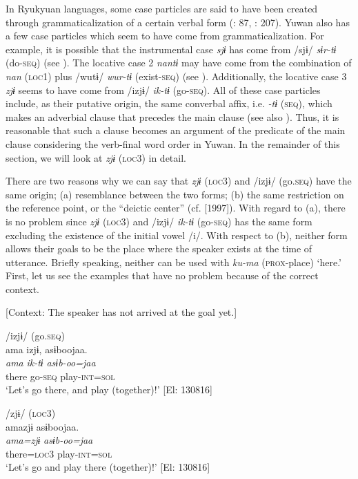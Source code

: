 In Ryukyuan languages, some case particles are said to have been created through grammaticalization of a certain verbal form (\citealt{NishiokaNakahara2000}: 87, \citealt{Shimoji2008}: 207). Yuwan also has a few case particles which seem to have come from grammaticalization. For example, it is possible that the instrumental case \textit{sjɨ} has come from /sjɨ/ \textit{sɨr-tɨ} (do-\textsc{seq}) (see ). The locative case 2 \textit{nantɨ} may have come from the combination of \textit{nan} (\textsc{loc1}) plus /wutɨ/ \textit{wur-tɨ} (exist-\textsc{seq}) (see ). Additionally, the locative case 3 \textit{zjɨ} seems to have come from /izjɨ/ \textit{ik-tɨ} (go-\textsc{seq}). All of these case particles include, as their putative origin, the same converbal affix, i.e. \textit{-tɨ} (\textsc{seq}), which makes an adverbial clause that precedes the main clause (see also ). Thus, it is reasonable that such a clause becomes an argument of the predicate of the main clause considering the verb-final word order in Yuwan. In the remainder of this section, we will look at \textit{zjɨ} (\textsc{loc3}) in detail.

There are two reasons why we can say that \textit{zjɨ} (\textsc{loc3}) and /izjɨ/ (go.\textsc{seq}) have the same origin; (a) resemblance between the two forms; (b) the same restriction on the reference point, or the “deictic center” (cf. \citealt{Fillmore1971} [1997]). With regard to (a), there is no problem since \textit{zjɨ} (\textsc{loc3}) and /izjɨ/ \textit{ik-tɨ} (go-\textsc{seq}) has the same form excluding the existence of the initial vowel /i/. With respect to (b), neither form allows their goals to be the place where the speaker exists at the time of utterance. Briefly speaking, neither can be used with \textit{ku-ma} (\textsc{prox}-place) ‘here.’ First, let us see the examples that have no problem because of the correct context.

\ea\label{ex:6-85}
  [Context: The speaker has not arrived at the goal yet.]

 \ea /izjɨ/ (go.\textsc{seq})\\
{\TM}
\glll  ama  izjɨ,  asɨboojaa.\\
\textit{ama}  \textit{ik-tɨ}  \textit{asɨb-oo=jaa}\\
there  go-\textsc{seq}  play-\textsc{int}=\textsc{sol}\\
\glt ‘Let’s go there, and play (together)!’ [El: 130816]

\ex /zjɨ/ (\textsc{loc3})\\
{\TM}
\glll  amazjɨ  asɨboojaa.\\
\textit{ama=zjɨ}  \textit{asɨb-oo=jaa}\\
there=\textsc{loc3}  play-\textsc{int}=\textsc{sol}\\
\glt ‘Let’s go and play there (together)!’ [El: 130816]
\z
\z

